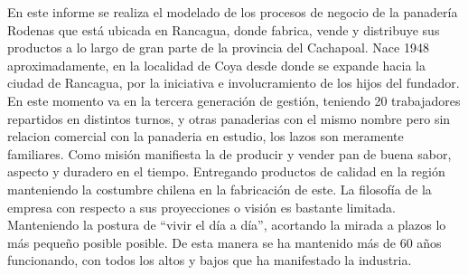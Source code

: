 En este informe se realiza el modelado de los procesos de negocio de la panadería Rodenas que está ubicada en Rancagua, donde fabrica, vende y distribuye sus productos a lo largo de gran parte de la provincia del Cachapoal. Nace 1948 aproximadamente, en la localidad de Coya desde donde se expande hacia la ciudad de Rancagua, por la iniciativa e involucramiento de los hijos del fundador. En este momento va en la tercera generación de gestión, teniendo 20 trabajadores repartidos en distintos turnos, y otras panaderias con el mismo nombre pero sin relacion comercial con la panaderia en estudio, los lazos son meramente familiares.
Como misión manifiesta la de producir y vender pan de buena sabor, aspecto y duradero en el tiempo. Entregando productos de calidad en la región manteniendo la costumbre chilena en la fabricación de este.
La filosofía de la empresa con respecto a sus proyecciones o visión es bastante limitada. Manteniendo la postura de “vivir el día a día”, acortando la mirada a plazos lo más pequeño posible posible. De esta manera se ha mantenido más de 60 años funcionando, con todos los altos y bajos que ha manifestado la industria.